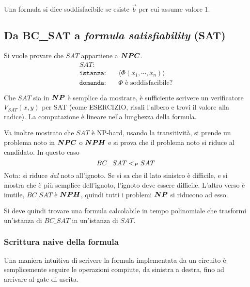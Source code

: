 Una formula si dice soddisfacibile se esiste $\vec{b}$ per cui assume valore $1$.

\subsection{Da BC\_SAT a \emph{formula satisfiability} (SAT)}
Si vuole provare che $SAT$ appartiene a $\bm{NPC}$.
\begin{align*}
    SAT:& \\
    \texttt{istanza:} \quad & \langle \Phi \left( x_1, \cdots, x_n \right) \rangle \\
    \texttt{domanda:} \quad & \Phi \text{ è soddisfacibile?}
\end{align*}

Che $SAT$ sia in $\bm{NP}$ è semplice da mostrare, è sufficiente scrivere un verificatore $V_{SAT}(x,y)$ per SAT (come ESERCIZIO, risali l'albero e trovi il valore alla radice). La computazione è lineare nella lunghezza della formula.

Va inoltre mostrato che $SAT$ è NP-hard, usando la transitività, si prende un problema noto in $\bm{NPC}$ o $\bm{NPH}$ e si prova che il problema noto si riduce al candidato. In questo caso
\begin{equation*}
    BC\_SAT <_P SAT
\end{equation*}
Nota: si riduce \emph{dal} noto all'ignoto. Se si sa che il lato sinistro è difficile, e si mostra che è più semplice dell'ignoto, l'ignoto deve essere difficile. L'altro verso è inutile, $BC\_SAT$ è $\bm{NPH}$, quindi tutti i problemi $\bm{NP}$ si riducono ad esso.

Si deve quindi trovare una formula calcolabile in tempo polinomiale che trasformi un'istanza di $BC\_SAT$ in un'istanza di $SAT$.

\subsubsection{Scrittura naive della formula}


Una maniera intuitiva di scrivere la formula implementata da un circuito è semplicemente seguire le operazioni compiute, da sinistra a destra, fino ad arrivare al gate di uscita.

